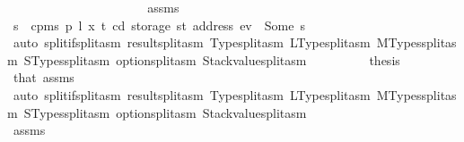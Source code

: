\begin{isabellebody}
\ \ \ \ \isamarkupfalse%
\isanewline
\ \ \ \ \ \ \isamarkupfalse%
\ {}{}\isanewline
\ \ \ \ \ \ \isamarkupfalse%
\ \isamarkupfalse%
\ assms\ {}\ {}{}\ {}\ {}\ \isamarkupfalse%
\ s\ \ {\isachardoublequoteopen}cpm{}s\ p\ l\ x\ t\ cd\ {\isacharparenleft}{\kern0pt}storage\ st\ {\isacharparenleft}{\kern0pt}address\ ev{\isacharparenright}{\kern0pt}{\isacharparenright}{\kern0pt}\ {\isacharequal}{\kern0pt}\ Some\ s{\isachardoublequoteclose}\isanewline
\ \ \ \ \ \ \ \ \isamarkupfalse%
\ {\isacharparenleft}{\kern0pt}auto\ split{\isacharcolon}{\kern0pt}if{\isacharunderscore}{\kern0pt}split{\isacharunderscore}{\kern0pt}asm\ result{\isachardot}{\kern0pt}split{\isacharunderscore}{\kern0pt}asm\ Type{\isachardot}{\kern0pt}split{\isacharunderscore}{\kern0pt}asm\ LType{\isachardot}{\kern0pt}split{\isacharunderscore}{\kern0pt}asm\ MTypes{\isachardot}{\kern0pt}split{\isacharunderscore}{\kern0pt}asm\ STypes{\isachardot}{\kern0pt}split{\isacharunderscore}{\kern0pt}asm\ option{\isachardot}{\kern0pt}split{\isacharunderscore}{\kern0pt}asm\ Stackvalue{\isachardot}{\kern0pt}split{\isacharunderscore}{\kern0pt}asm{\isacharparenright}{\kern0pt}\isanewline
\ \ \ \ \ \ \isamarkupfalse%
\ \isamarkupfalse%
\ {\isacharquery}{\kern0pt}thesis\ \isamarkupfalse%
\ that{\isacharparenleft}{\kern0pt}{}{\isacharparenright}{\kern0pt}\ assms\ {}\isanewline
\ \ \ \ \ \ \ \ \isamarkupfalse%
\ {\isacharparenleft}{\kern0pt}auto\ split{\isacharcolon}{\kern0pt}if{\isacharunderscore}{\kern0pt}split{\isacharunderscore}{\kern0pt}asm\ result{\isachardot}{\kern0pt}split{\isacharunderscore}{\kern0pt}asm\ Type{\isachardot}{\kern0pt}split{\isacharunderscore}{\kern0pt}asm\ LType{\isachardot}{\kern0pt}split{\isacharunderscore}{\kern0pt}asm\ MTypes{\isachardot}{\kern0pt}split{\isacharunderscore}{\kern0pt}asm\ STypes{\isachardot}{\kern0pt}split{\isacharunderscore}{\kern0pt}asm\ option{\isachardot}{\kern0pt}split{\isacharunderscore}{\kern0pt}asm\ Stackvalue{\isachardot}{\kern0pt}split{\isacharunderscore}{\kern0pt}asm{\isacharparenright}{\kern0pt}\isanewline
\ \ \ \ \isamarkupfalse%
\isanewline
\ \ \ \ \ \ \isamarkupfalse%
\ {}{}\isanewline
\ \ \ \ \ \ \isamarkupfalse%
\ \isamarkupfalse%
\ assms\ {}\ {}{}\ \isamarkupfalse%

\end{isabellebody}
